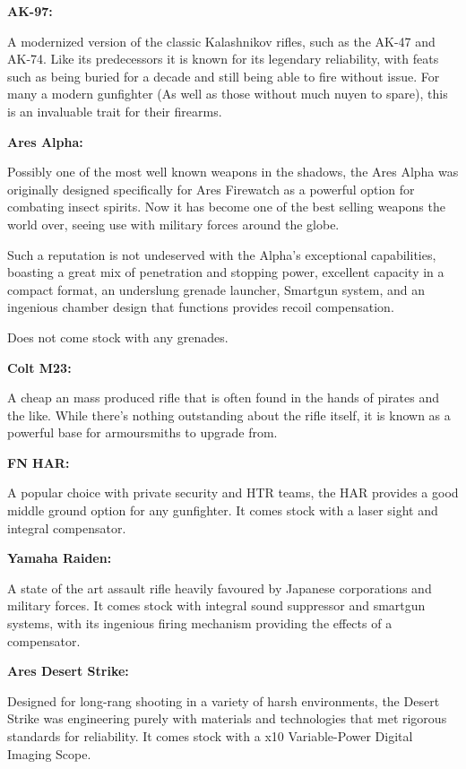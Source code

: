 \begin{multicols}{2}
\begin{breakbox}
	
	\textbf{AK-97:}
	
	A modernized version of the classic Kalashnikov rifles, such as the AK-47 and AK-74. Like its predecessors it is known for its legendary reliability, with feats such as being buried for a decade and still being able to fire without issue. For many a modern gunfighter (As well as those without much nuyen to spare), this is an invaluable trait for their firearms.
	
	\textbf{Ares Alpha:}
	
	Possibly one of the most well known weapons in the shadows, the Ares Alpha was originally designed specifically for Ares Firewatch as a powerful option for combating insect spirits. Now it has become one of the best selling weapons the world over, seeing use with military forces around the globe. 
	
	Such a reputation is not undeserved with the Alpha's exceptional capabilities, boasting a great mix of penetration and stopping power, excellent capacity in a compact format, an underslung grenade launcher, Smartgun system, and an ingenious chamber design that functions provides recoil compensation.
	
	Does not come stock with any grenades.
	
	\textbf{Colt M23:}
	
	A cheap an mass produced rifle that is often found in the hands of pirates and the like. While there's nothing outstanding about the rifle itself, it is known as a powerful base for armoursmiths to upgrade from.
	
	\textbf{FN HAR:}
	
	A popular choice with private security and HTR teams, the HAR provides a good middle ground option for any gunfighter. It comes stock with a laser sight and integral compensator.
	
	\textbf{Yamaha Raiden:}
	
	A state of the art assault rifle heavily favoured by Japanese corporations and military forces. It comes stock with integral sound suppressor and smartgun systems, with its ingenious firing mechanism providing the effects of a compensator.  
	
	\textbf{Ares Desert Strike:}
	
	Designed for long-rang shooting in a variety of harsh environments, the Desert Strike was engineering purely with materials and technologies that met rigorous standards for reliability. It comes stock with a x10 Variable-Power Digital Imaging Scope.
	

\end{breakbox}
\end{multicols}

